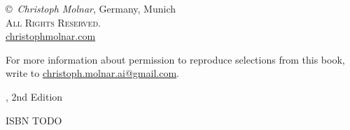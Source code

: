 \thispagestyle{empty}
\begin{center}

\copyright~\the\year \textit{Christoph Molnar}, Germany, Munich\\
\textsc{All Rights Reserved.}\\
\url{christophmolnar.com}

For more information about permission to reproduce selections from this book, write to \url{christoph.molnar.ai@gmail.com}.

	\the\year, 2nd Edition

\ifxetex
	\textsc{ISBN TODO} 
\fi


\end{center}

\mainmatter
{}




